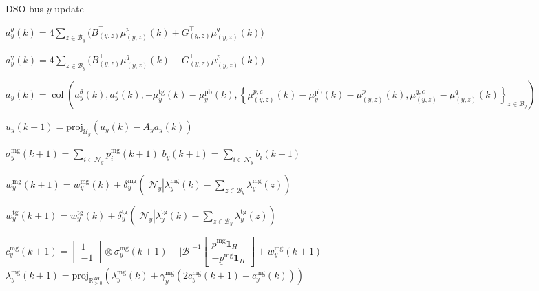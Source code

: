 \documentclass[10pt]{article}
\newtheorem{definitiox	n}{Definition}{\it}{}
\newcommand{\mc}{\mathcal}
\newcommand{\bb}{\mathbb}
\newcommand{\R}{\bb R}
\newcommand{\proj}{\mathrm{proj}}
\newcommand{\col}{\operatorname{col}}
\newcommand{\0}{\mathbf{0}}
\newcommand{\1}{\mathbf{1}}
\begin{document}
\begin{algorithm}[H]
\caption{DSO bus $y$ update}
\begin{algorithmic}[1]
\Statex
\Primal{}
\State
$
a^\theta_{y}(k) = 	
4	\sum_{z\in \mc B_y} \big( B_{(y,z)}^\top  \mu^p_{(y,z)}(k) + G_{(y,z)}^\top \mu^q_{(y,z)}(k) \big)$

\State
$
a^{\text{v}}_{y}(k) = 4	
	\sum_{z\in \mc B_y} \big( B_{(y,z)}^\top  \mu^q_{(y,z)}(k)  - G_{(y,z)}^\top \mu^p_{(y,z) }  (k) \big)$



\State
$
a_{y}(k) = \col \left( 	
	a^\theta_{y}(k),a^{\text{v}}_{y}(k),-\mu_y^{\text{tg}}(k) - \mu_y^{\text{pb}}(k), 
	\left\{ \mu^{p,c}_{(y,z)}(k) -\mu_y^{\text{pb}}(k) - \mu_{(y,z)}^p(k) ,  \mu^{q,c}_{(y,z)} -\mu_{(y,z)}^q(k) \right\}_{z \in \mc B_y}
	\right)$

\State 	$u_{y}(k+1) = \proj_{\mc U_{y}}  \left( u_{y}(k) - A_{y} a_{y}(k) \right)$
\EndPrimal

\Agg{}
\State
$ \sigma_y^{\text{mg}}(k+1) = \sum_{i \in \mc N_y} p_i^{\text{mg}}(k+1) $
\State
$b_y(k+1) = \sum_{i \in \mc N_y} b_i(k+1)$
\EndAgg


\Aux{}
\State
$ w_y^{\text{mg}}(k+1) = w_y^{\text{mg}}(k) + \delta^{\text{mg}}_y \left( |\mc N_y | \lambda^{\text{mg}}_y (k) - \sum_{z \in \mc B_y} \lambda^{\text{mg}}_y (z) \right) $

\State
$ w_y^{\text{tg}}(k+1) = w_y^{\text{tg}}(k) + \delta^{\text{tg}}_y \left( |\mc N_y | \lambda^{\text{tg}}_y (k) - \sum_{z \in \mc B_y} \lambda^{\text{tg}}_y (z) \right) $

\EndAux
\State



\State
$c^{\text{mg}}_{y}(k+1) = 
	\left[
	\begin{smallmatrix}
	1\\
	- 1 
	\end{smallmatrix}
	\right] \otimes \sigma_y^{\text{mg}}(k+1)
	-
	|\mc B|^{-1}
	\left[
	\begin{smallmatrix}
	\overline{p}^{\mathrm{mg}}\1_{H} \\
	-     \underline{p}^{\mathrm{mg}} \1_{H}
	\end{smallmatrix} 
	\right]  + w_y^{\text{mg}}(k+1)$
	\State
$\lambda_y^{\text{mg}}(k+1) = \textstyle
	\proj_{\R^{2 H}_{\geq 0}}\left( 
	\lambda_y^{\text{mg}}(k) + \gamma_y^{\text{mg}} (2c^{\text{mg}}_{y}(k+1)-c^{\text{mg}}_{y}(k)
	)
	 \right)$


\end{algorithmic}
\end{algorithm}
\end{document}
